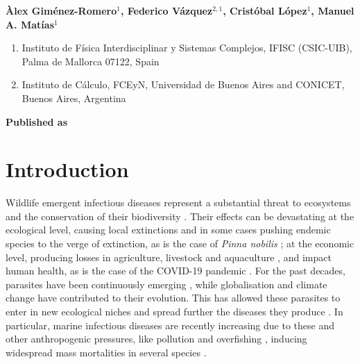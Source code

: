 \vspace{1cm}

\begin{center}
    \textbf{Àlex Giménez-Romero$^{1}$, Federico Vázquez$^{2,1}$, Cristóbal
        López$^{1}$, Manuel A. Matías$^{1}$}
\end{center}

\vspace{1cm}

\begin{enumerate}
    \small
    \item Instituto de Física Interdisciplinar y Sistemas Complejos, IFISC
          (CSIC-UIB), Palma de Mallorca 07122, Spain
    \item Instituto de Cálculo, FCEyN, Universidad de Buenos Aires and CONICET,
          Buenos Aires, Argentina

\end{enumerate}

\vspace{1cm}

\textbf{Published as}

\vspace{0.5cm}


\newpage
\section{Introduction}

Wildlife emergent infectious diseases represent a substantial threat to
ecosystems and the conservation of their biodiversity \cite{Daszak443}. Their
effects can be devastating at the ecological level, causing local extinctions
\cite{Daszak443} and in some cases pushing endemic species to the verge of
extinction, as is the case of \textit{Pinna nobilis}
\cite{Cabanellas2019}; at the economic level, producing losses in agriculture,
livestock and aquaculture \cite{Vurro2010, Tomley2009, Pernet2016}, and impact
human health, as is the case of the COVID-19 pandemic \cite{Salata2020}. For
the past decades, parasites have been continuously emerging \cite{Morens2004,
    Daszak2017}, while globalisation and climate change have contributed to
their
evolution. This has allowed these parasites to enter in new ecological niches
and spread further the diseases they produce \cite{Aguirre2008}. In particular,
marine infectious diseases are recently increasing due to these and other
anthropogenic pressures, like pollution and overfishing \cite{Lafferty2004},
inducing widespread mass mortalities in several species \cite{Eisenlord2016,
    JONES201648, VAZQUEZ2017}.

